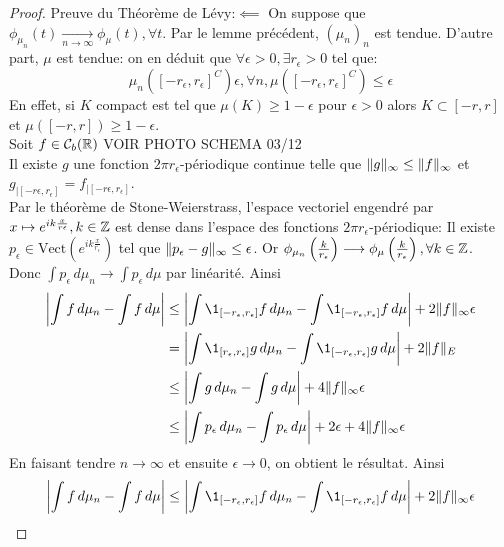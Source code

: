 \documentclass[]{report}
\begin{document}
    \begin{proof}
        Preuve du Théorème de Lévy:$\impliedby$ On suppose que $\phi_{\mu_n}(t)\underset{n\to \infty}{\longrightarrow}\phi_\mu(t),\forall t$. Par le lemme précédent, $(\mu_n)_n$ est tendue. D'autre part, $\mu$ est tendue: on en déduit que $\forall \epsilon>0,\exists r_\epsilon >0$ tel que:
        \[\mu_n\left([-r_\epsilon,r_\epsilon]^C\right)\epsilon,\forall n,\mu\left([-r_\epsilon,r_\epsilon]^C\right)\le \epsilon\]
        En effet, si $K$ compact est tel que $\mu(K)\ge 1-\epsilon$ pour $\epsilon >0$ alors $K\subset [-r,r]$ et $\mu([-r,r])\ge 1-\epsilon$.\\
        Soit $f\in \mathcal{C}_b(\mathbb{R})$ VOIR PHOTO SCHEMA 03/12\\
        Il existe $g$ une fonction $2\pi r_\epsilon$-périodique continue telle que $\lVert g \rVert_\infty\le \lVert f \rVert_\infty$ et $g_{|[-r\epsilon,r_\epsilon]}=f_{|[-r\epsilon,r_\epsilon]}$.\\
        Par le théorème de Stone-Weierstrass, l'espace vectoriel engendré par $x\mapsto e^{ik\frac{x}{r\epsilon}},k\in \mathbb{Z}$ est dense dans l'espace des fonctions $2\pi r_\epsilon$-périodique: Il existe $p_\epsilon\in\text{Vect} (e^{ik\frac{x}{r_\epsilon}})$ tel que $\lVert p_\epsilon -g \rVert_\infty\le \epsilon$. Or $\phi_{\mu_n}\left(\frac{k}{r_\epsilon}\right)\longrightarrow \phi_\mu\left(\frac{k}{r_\epsilon}\right),\forall k\in \mathbb{Z}$.\\
        Donc $\int p_\epsilon \,d\mu_n\longrightarrow \int p_\epsilon \,d\mu$ par linéarité. Ainsi
        \begin{align*}
            \left|\int f\, d\mu_n-\int f\,d\mu\right|&\le \left| \int \1_{[-r_\epsilon,r_\epsilon]} f\,d\mu_n -\int \1_{[-r_\epsilon,r_\epsilon]} f\, d\mu \right| + 2\norme{f}_{\infty} \epsilon\\
            &=\left|\int \1_{[r_\epsilon,r_\epsilon]}g\, d\mu_n -\int \1_{[-r_\epsilon,r_\epsilon]} g\,d\mu \right| +2\norme{f}_E\\
            &\le \left| \int g\,d\mu_n -\int g\,d\mu\right| +4\norme{f}_\infty \epsilon\\
            &\le \left|\int p_\epsilon \,d\mu_n -\int p_\epsilon \,d\mu\right| +2\epsilon +4\norme{f}_\infty \epsilon
        \end{align*}
        En faisant tendre $n\to \infty$ et ensuite $\epsilon\to 0$, on obtient le résultat. Ainsi
        \[\left|\int f\,d\mu_n -\int f\, d\mu\right|\le \left|\int \1_{[-r_\epsilon,r_\epsilon]} f\,d\mu_n -\int \1_{[-r_\epsilon,r_\epsilon]} f\,d\mu\right| +2\norme{f}_\infty \epsilon\]
    \end{proof}
\end{document}
